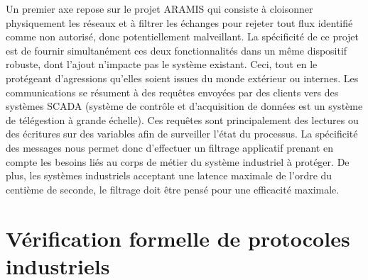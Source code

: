 \documentclass{article}
\newcommand{\aramis}{ARAMIS}
\begin{document}
Un premier axe repose sur le projet \aramis{} \cite{aramis} qui consiste à
cloisonner physiquement les réseaux et à filtrer les échanges pour rejeter tout
flux identifié comme non autorisé, donc potentiellement malveillant.
La spécificité de ce projet est de fournir simultanément ces deux
fonctionnalités dans un même dispositif robuste, dont l'ajout n'impacte pas le
système existant.
Ceci, tout en le protégeant d'agressions qu'elles soient issues du monde
extérieur ou internes.
Les communications se résument à des requêtes envoyées par des clients vers des
systèmes SCADA (système de contrôle et d'acquisition de données est un système
de télégestion à grande échelle).
Ces requêtes sont principalement des lectures ou des écritures sur des variables
afin de surveiller l'état du processus.
La spécificité des messages nous permet donc d'effectuer un filtrage applicatif
prenant en compte les besoins liés au corps de métier du système industriel à
protéger.
De plus, les systèmes industriels acceptant une latence maximale de l'ordre du
centième de seconde, le filtrage doit être pensé pour une efficacité maximale.

%        

\section{Vérification formelle de protocoles industriels}\label{sec:protocols}
\end{document}

